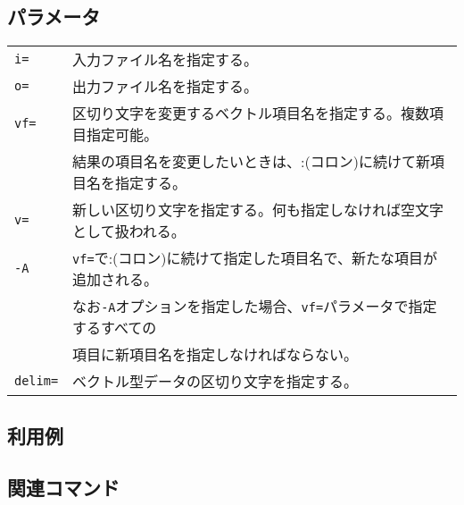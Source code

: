 \subsection*{パラメータ}
\begin{table}[htbp]
{\small
\begin{tabular}{ll}
\verb|i=|    & 入力ファイル名を指定する。\\
\verb|o=|    & 出力ファイル名を指定する。\\
\verb|vf=|   & 区切り文字を変更するベクトル項目名を指定する。複数項目指定可能。 \\
             & 結果の項目名を変更したいときは、:(コロン)に続けて新項目名を指定する。\\
\verb|v=|    & 新しい区切り文字を指定する。何も指定しなければ空文字として扱われる。 \\
\verb|-A|    & \verb|vf=|で:(コロン)に続けて指定した項目名で、新たな項目が追加される。\\
             & なお\verb|-A|オプションを指定した場合、\verb|vf=|パラメータで指定するすべての\\
             & 項目に新項目名を指定しなければならない。\\
\verb|delim=| & ベクトル型データの区切り文字を指定する。\\
\end{tabular}
}
\end{table} 

\subsection*{利用例}


\subsection*{関連コマンド}

%
